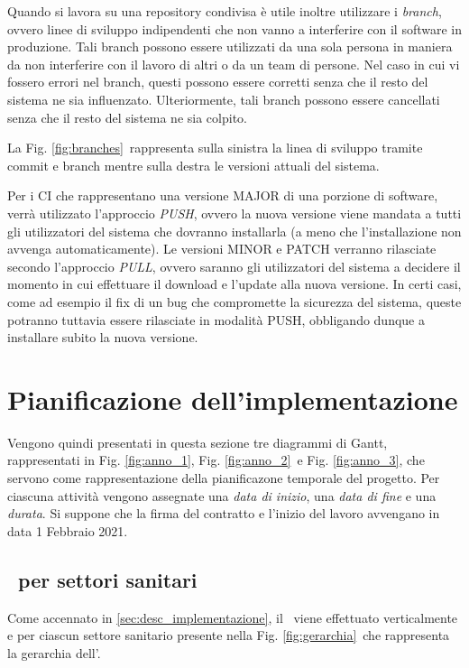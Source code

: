 	Quando si lavora su una repository condivisa è utile inoltre utilizzare i \textit{branch}, ovvero linee di sviluppo indipendenti che non vanno a interferire con il software in produzione.
	Tali branch possono essere utilizzati da una sola persona in maniera da non interferire con il lavoro di altri o da un team di persone.
	Nel caso in cui vi fossero errori nel branch, questi possono essere corretti senza che il resto del sistema ne sia influenzato.
	Ulteriormente, tali branch possono essere cancellati senza che il resto del sistema ne sia colpito.
	
	La Fig. \ref{fig:branches}~rappresenta sulla sinistra la linea di sviluppo tramite commit e branch mentre sulla destra le versioni attuali del sistema.
	
	Per i CI che rappresentano una versione MAJOR di una porzione di software, verrà utilizzato l'approccio \textit{PUSH}, ovvero la nuova versione viene mandata a tutti gli utilizzatori del sistema che dovranno installarla (a meno che l'installazione non avvenga automaticamente).
	Le versioni MINOR e PATCH verranno rilasciate secondo l'approccio \textit{PULL}, ovvero saranno gli utilizzatori del sistema a decidere il momento in cui effettuare il download e l'update alla nuova versione.
	In certi casi, come ad esempio il fix di un bug che compromette la sicurezza del sistema, queste potranno tuttavia essere rilasciate in modalità PUSH, obbligando dunque a installare subito la nuova versione.
	
\newpage
\section{Pianificazione dell'implementazione}\label{sec:pianificazione}

	Vengono quindi presentati in questa sezione tre diagrammi di Gantt, rappresentati in Fig. \ref{fig:anno_1}, Fig. \ref{fig:anno_2}~e Fig. \ref{fig:anno_3}, che servono come rappresentazione della pianificazone temporale del progetto.
	Per ciascuna attività vengono assegnate una \textit{data di inizio}, una \textit{data di fine} e una \textit{durata}.
	Si suppone che la firma del contratto e l'inizio del lavoro avvengano in data 1 Febbraio 2021.
		
	\subsection{\rollout~per settori sanitari}	
	
		Come accennato in \ref{sec:desc_implementazione}, il \rollout~viene effettuato verticalmente e per ciascun settore sanitario presente nella Fig. \ref{fig:gerarchia}~che rappresenta la gerarchia dell'\istituto.
		
